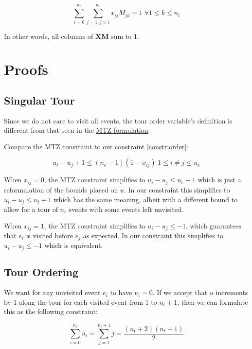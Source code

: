 \documentclass[11pt]{article}
\begin{document}
\begin{equation} \label{constr:teams}
    \sum_{i=0}^{n_e} \sum_{j=1, j > i}^{n_e} x_{ij}M_{jk}  = 1 \; \forall 1 \leq k \leq n_t
\end{equation}

In other words, all columns of $\mathbf{X} \mathbf{M}$ sum to 1.

\section{Proofs}
\subsection{Singular Tour}
Since we do not care to visit all events, the tour order variable's definition is different from that seen in the \href{https://en.wikipedia.org/wiki/Travelling_salesman_problem#Miller%E2%80%93Tucker%E2%80%93Zemlin_formulation}{MTZ formulation}.

Compare the MTZ constraint to our constraint \eqref{constr:order}:

\begin{equation} \label{constr:mtz}
    u_i - u_j + 1 \leq (n_e - 1)(1 - x_{ij}) \; 1 \leq i \neq j \leq n_e
\end{equation}

When $x_{ij} = 0$, the MTZ constraint simplifies to $u_i - u_j \leq n_e - 1$ which is just a reformulation of the bounds placed on $u$. In our constraint this simplifies to $u_i - u_j \leq n_t + 1$ which has the same meaning, albeit with a different bound to allow for a tour of $n_t$ events with some events left unvisited.

When $x_{ij} = 1$, the MTZ constraint simplifies to $u_i - u_j \leq -1$, which guarantees that $e_i$ is visited before $e_j$ as expected. In our constraint this simplifies to $u_i - u_j \leq -1$ which is equivalent.

\subsection{Tour Ordering}
We want for any unvisited event $e_i$ to have $u_i = 0$. If we accept that $u$ increments by 1 along the tour for each visited event from 1 to $n_t + 1$, then we can formulate this as the following constraint:

\begin{equation} \label{constr:unvisited}
    \sum_{i=0}^{n_e} u_i = \sum_{j=1}^{n_t + 1} j = \frac{(n_t + 2)(n_t + 1)}{2}
\end{equation}
\end{document}
